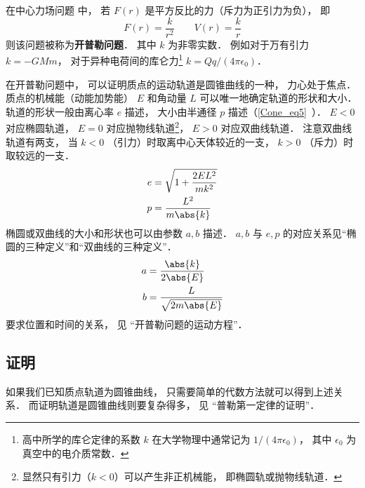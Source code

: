 

在中心力场问题 中， 若 $F(r)$ 是平方反比的力（斥力为正引力为负）， 即
\begin{equation}
F(r) = \frac{k}{r^2}  \qquad V(r) = \frac{k}{r}
\end{equation}
则该问题被称为\textbf{开普勒问题}． 其中 $k$ 为非零实数． 例如对于万有引力 $k = -GMm$， 对于异种电荷间的库仑力\footnote{高中所学的库仑定律的系数 $k$ 在大学物理中通常记为 $1/(4\pi\epsilon_0)$， 其中 $\epsilon_0$ 为真空中的电介质常数．} $k = Qq/(4\pi\epsilon_0)$．

在开普勒问题中， 可以证明质点的运动轨道是圆锥曲线的一种， 力心处于焦点． 质点的机械能（动能加势能） $E$ 和角动量 $L$ 可以唯一地确定轨道的形状和大小． 轨道的形状一般由离心率 $e$ 描述， 大小由半通径 $p$ 描述（\autoref{Cone_eq5}~）． $E < 0$ 对应椭圆轨道， $E = 0$ 对应抛物线轨道\footnote{显然只有引力（$k < 0$）可以产生非正机械能， 即椭圆轨或抛物线轨道．}， $E > 0$ 对应双曲线轨道． 注意双曲线轨道有两支， 当 $k < 0$ （引力）时取离中心天体较近的一支， $k > 0$ （斥力）时取较远的一支．
\begin{align}
e &= \sqrt{1 + \frac{2EL^2}{mk^2}}\label{CelBd_eq2}\\
p &= \frac{L^2}{m\abs{k}}\label{CelBd_eq3}
\end{align}
椭圆或双曲线的大小和形状也可以由参数 $a,b$ 描述． $a,b$ 与 $e,p$ 的对应关系见“椭圆的三种定义”和“双曲线的三种定义”．
\begin{align}
a &= \frac{\abs{k}}{2\abs{E}}\label{CelBd_eq7}\\
b &= \frac{L}{\sqrt{2m\abs{E}}}\label{CelBd_eq8}
\end{align}
要求位置和时间的关系， 见 “开普勒问题的运动方程”．

\subsection{证明}
如果我们已知质点轨道为圆锥曲线， 只需要简单的代数方法就可以得到上述关系． 而证明轨道是圆锥曲线则要复杂得多， 见 “普勒第一定律的证明”．

